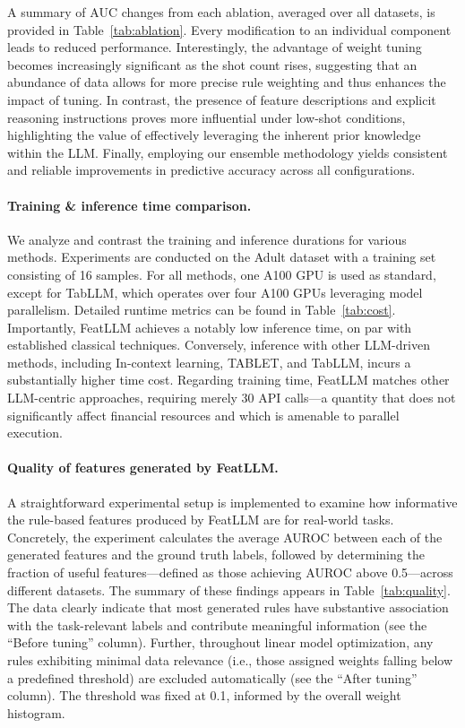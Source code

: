 A summary of AUC changes from each ablation, averaged over all datasets, is provided in Table~\ref{tab:ablation}. Every modification to an individual component leads to reduced performance. Interestingly, the advantage of weight tuning becomes increasingly significant as the shot count rises, suggesting that an abundance of data allows for more precise rule weighting and thus enhances the impact of tuning. In contrast, the presence of feature descriptions and explicit reasoning instructions proves more influential under low-shot conditions, highlighting the value of effectively leveraging the inherent prior knowledge within the LLM. Finally, employing our ensemble methodology yields consistent and reliable improvements in predictive accuracy across all configurations.

\vspace*{-0.12in}
\paragraph{Training \& inference time comparison.} We analyze and contrast the training and inference durations for various methods. Experiments are conducted on the Adult dataset with a training set consisting of 16 samples. For all methods, one A100 GPU is used as standard, except for TabLLM, which operates over four A100 GPUs leveraging model parallelism. Detailed runtime metrics can be found in Table~\ref{tab:cost}. Importantly, \textsf{FeatLLM} achieves a notably low inference time, on par with established classical techniques. Conversely, inference with other LLM-driven methods, including In-context learning, TABLET, and TabLLM, incurs a substantially higher time cost. Regarding training time, \textsf{FeatLLM} matches other LLM-centric approaches, requiring merely 30 API calls—a quantity that does not significantly affect financial resources and which is amenable to parallel execution.

\vspace*{-0.12in}
\paragraph{Quality of features generated by \textsf{FeatLLM}.}
A straightforward experimental setup is implemented to examine how informative the rule-based features produced by \textsf{FeatLLM} are for real-world tasks. Concretely, the experiment calculates the average AUROC between each of the generated features and the ground truth labels, followed by determining the fraction of useful features—defined as those achieving AUROC above 0.5—across different datasets. The summary of these findings appears in Table~\ref{tab:quality}. The data clearly indicate that most generated rules have substantive association with the task-relevant labels and contribute meaningful information (see the ``Before tuning'' column). Further, throughout linear model optimization, any rules exhibiting minimal data relevance (i.e., those assigned weights falling below a predefined threshold) are excluded automatically (see the ``After tuning'' column). The threshold was fixed at 0.1, informed by the overall weight histogram.

